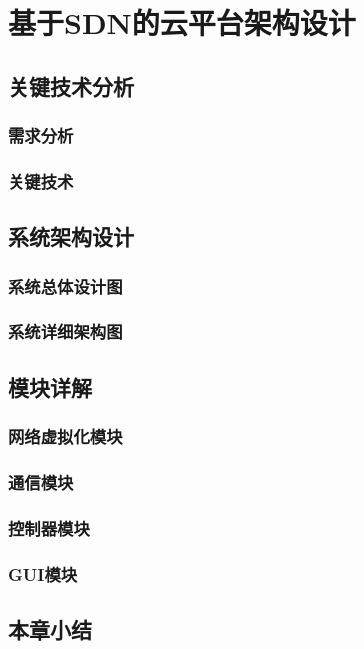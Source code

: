 \chapter{基于SDN的云平台架构设计}
\section{关键技术分析}
\subsection{需求分析}
\subsection{关键技术}
\section{系统架构设计}
\subsection{系统总体设计图}
\subsection{系统详细架构图}
\section{模块详解}
\subsection{网络虚拟化模块}
\subsection{通信模块}
\subsection{控制器模块}
\subsection{GUI模块}
\section{本章小结}



\ifx\usechapbib\empty
\nocite{BSTcontrol}
\setcounter{NAT@ctr}{0}


\fi